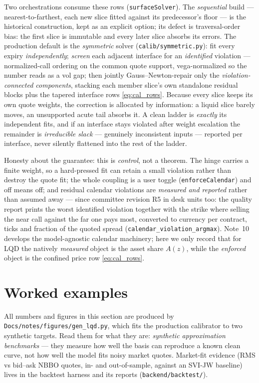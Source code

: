 \documentclass[11pt]{article}
\begin{document}
Two orchestrations consume these rows (\texttt{surfaceSolver}). The
\emph{sequential} build --- nearest-to-farthest, each new slice fitted
against its predecessor's floor --- is the historical construction, kept as
an explicit option; its defect is traversal-order bias: the first slice is
immutable and every later slice absorbs its errors. The production default
is the \emph{symmetric} solver (\texttt{calib/symmetric.py}): fit every
expiry \emph{independently}; \emph{screen} each adjacent interface for an
\emph{identified} violation --- normalized-call ordering on the common quote
support, vega-normalized so the number reads as a vol gap; then jointly
Gauss--Newton-repair only the \emph{violation-connected components},
stacking each member slice's own standalone residual blocks plus the tapered
interface rows \eqref{eq:cal_rows}. Because every slice keeps its own quote
weights, the correction is allocated by information: a liquid slice barely
moves, an unsupported acute tail absorbs it. A clean ladder is \emph{exactly}
its independent fits, and if an interface stays violated after weight
escalation the remainder is \emph{irreducible slack} --- genuinely
inconsistent inputs --- reported per interface, never silently flattened
into the rest of the ladder.

Honesty about the guarantee: this is \emph{control}, not a theorem. The hinge
carries a finite weight, so a hard-pressed fit can retain a small violation
rather than destroy the quote fit; the whole coupling is a user toggle
(\texttt{enforceCalendar}) and off means off; and residual calendar violations
are \emph{measured and reported} rather than assumed away --- since committee
revision R5 in desk units too: the quality report prints the worst identified
violation together with the strike where selling the near call against the
far one pays most, converted to currency per contract, ticks and fraction of
the quoted spread (\texttt{calendar\_violation\_argmax}). Note~10 develops
the model-agnostic calendar machinery; here we only record that for LQD the
natively \emph{measured} object is the asset share $A(z)$, while the
\emph{enforced} object is the confined price row \eqref{eq:cal_rows}.

\section{Worked examples}
\label{sec:examples}

All numbers and figures in this section are produced by
\texttt{Docs/notes/figures/gen\_lqd.py}, which fits the production calibrator to
two synthetic targets. Read them for what they are: \emph{synthetic
approximation benchmarks} --- they measure how well the basis can reproduce a
known clean curve, not how well the model fits noisy market quotes.
Market-fit evidence (RMS vs bid--ask NBBO quotes, in- and out-of-sample,
against an SVI-JW baseline) lives in the backtest harness and its reports
(\texttt{backend/backtest/}).
\end{document}
